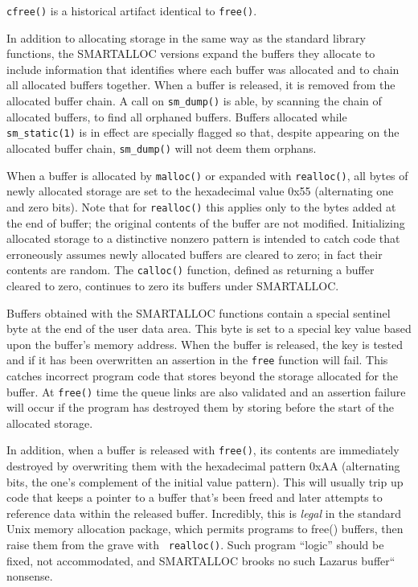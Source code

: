 {\tt cfree()} is a historical artifact identical to {\tt free()}. 

In addition to allocating storage in the same way as the standard library
functions, the SMARTALLOC versions expand the buffers they allocate to include
information that identifies where each buffer was allocated and to chain all
allocated buffers together. When a buffer is released, it is removed from the
allocated buffer chain. A call on {\tt sm\_dump()} is able, by scanning the
chain of allocated buffers, to find all orphaned buffers. Buffers allocated
while {\tt sm\_static(1)} is in effect are specially flagged so that, despite
appearing on the allocated buffer chain, {\tt sm\_dump()} will not deem them
orphans. 

When a buffer is allocated by {\tt malloc()} or expanded with {\tt realloc()},
all bytes of newly allocated storage are set to the hexadecimal value 0x55
(alternating one and zero bits). Note that for {\tt realloc()} this applies
only to the bytes added at the end of buffer; the original contents of the
buffer are not modified. Initializing allocated storage to a distinctive
nonzero pattern is intended to catch code that erroneously assumes newly
allocated buffers are cleared to zero; in fact their contents are random. The
{\tt calloc()} function, defined as returning a buffer cleared to zero,
continues to zero its buffers under SMARTALLOC. 

Buffers obtained with the SMARTALLOC functions contain a special sentinel byte
at the end of the user data area. This byte is set to a special key value
based upon the buffer's memory address. When the buffer is released, the key
is tested and if it has been overwritten an assertion in the {\tt free}
function will fail. This catches incorrect program code that stores beyond the
storage allocated for the buffer. At {\tt free()} time the queue links are
also validated and an assertion failure will occur if the program has
destroyed them by storing before the start of the allocated storage. 

In addition, when a buffer is released with {\tt free()}, its contents are
immediately destroyed by overwriting them with the hexadecimal pattern 0xAA
(alternating bits, the one's complement of the initial value pattern). This
will usually trip up code that keeps a pointer to a buffer that's been freed
and later attempts to reference data within the released buffer. Incredibly,
this is {\it legal} in the standard Unix memory allocation package, which
permits programs to free() buffers, then raise them from the grave with {\tt
realloc()}. Such program ``logic'' should be fixed, not accommodated, and
SMARTALLOC brooks no such Lazarus buffer`` nonsense. 

